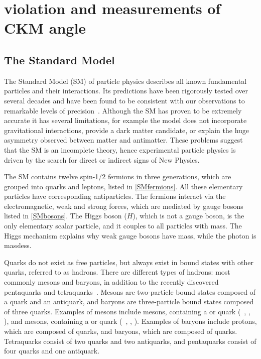 %

\chapter{\label{ch:2-background}\CP violation and measurements of CKM angle \Pgamma} 


\section{The Standard Model}

The Standard Model (SM) of particle physics describes all known fundamental particles and their interactions. Its predictions have been rigorously tested over several decades and have been found to be consistent with our observations to remarkable levels of precision~\cite{SMprecision}. Although the SM has proven to be extremely accurate it has several limitations, for example the model does not incorporate gravitational interactions, provide a dark matter candidate, or explain the huge asymmetry observed between matter and antimatter. These problems suggest that the SM is an incomplete theory, hence experimental particle physics is driven by the search for direct or indirect signs of New Physics.

The SM contains twelve spin-1/2 fermions in three generations, which are grouped into quarks and leptons, listed in \tab\ref{SMfermions}. All these elementary particles have corresponding antiparticles. The fermions interact via the electromagnetic, weak and strong forces, which are mediated by gauge bosons listed in \tab\ref{SMbosons}. The Higgs boson ($H$), which is not a gauge boson, is the only elementary scalar particle, and it couples to all particles with mass. The Higgs mechanism explains why weak gauge bosons have mass, while the photon is massless. 

Quarks do not exist as free particles, but always exist in bound states with other quarks, referred to as hadrons. There are different types of hadrons: most commonly mesons and baryons, in addition to the recently discovered pentaquarks and tetraquarks~\cite{pentaquark,tetraquark_BESIII,tetraquark_lhcb}. Mesons are two-particle bound states composed of a quark and an antiquark, and baryons are three-particle bound states composed of three quarks. Examples of mesons include \B mesons, containing a \bquark or \bquarkbar quark (\eg~\Bm, \Bp, \Bz), and \D mesons, containing a \cquark or \cquarkbar quark (\eg~\Dm, \Dp, \Dz). Examples of baryons include protons, which are composed of \uquark\uquark\dquark quarks, and \Lz baryons, which are composed of \uquark\dquark\squark quarks. Tetraquarks consist of two quarks and two antiquarks, and pentaquarks consist of four quarks and one antiquark.


